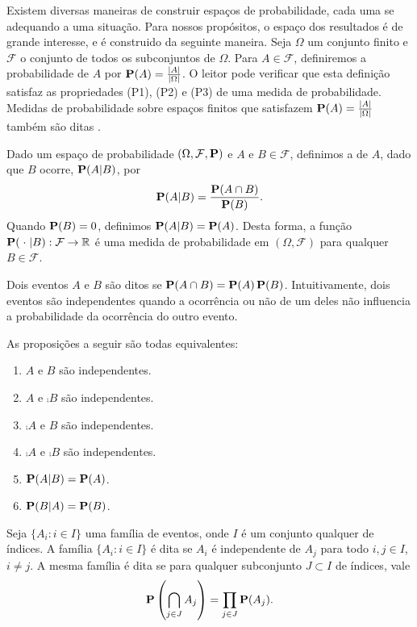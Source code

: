 Existem diversas maneiras de construir espaços de probabilidade, cada uma se adequando a uma situação. Para nossos propósitos, o espaço dos resultados  é de grande interesse, e é construido da seguinte maneira.
Seja $\Omega$ um conjunto finito e $\mathcal{F}$ o conjunto de todos os subconjuntos de $\Omega$. Para $A \in \mathcal{F}$, definiremos a probabilidade de $A$ por $\operatorname{\mathbf{P}}(A) = \frac{\left | A \right |}{\left | \Omega \right |}$. O leitor pode verificar que esta definição satisfaz as propriedades (P1), (P2) e (P3) de uma medida de probabilidade. Medidas de probabilidade sobre espaços finitos que satisfazem $\operatorname{\mathbf{P}}(A) = \frac{\left | A \right |}{\left | \Omega \right |}$ também são ditas .

Dado um espaço de probabilidade $(\Omega, \mathcal{F}, \operatorname{\mathbf{P}})$ e $A$ e $B \in \mathcal{F}$, definimos a  de $A$, dado que $B$ ocorre, $\operatorname{\mathbf{P}}(A | B)$, por
\[ \operatorname{\mathbf{P}}(A|B) = \frac{\operatorname{\mathbf{P}}(A \cap B)}{\operatorname{\mathbf{P}}(B)}. \]
Quando $\operatorname{\mathbf{P}}(B) = 0$, definimos $\operatorname{\mathbf{P}}(A|B) = \operatorname{\mathbf{P}}(A)$. Desta forma, a função $\operatorname{\mathbf{P}}(\; \cdot \;| B) : \mathcal{F} \to \mathbb{R}$ é uma medida de probabilidade em $(\Omega, \mathcal{F})$ para qualquer $B \in \mathcal{F}$.

Dois eventos $A$ e $B$ são ditos  se $\operatorname{\mathbf{P}}(A \cap B) = \operatorname{\mathbf{P}}(A) \operatorname{\mathbf{P}}(B)$. Intuitivamente, dois eventos são independentes quando a ocorrência ou não de um deles não influencia a probabilidade da ocorrência do outro evento.

As proposições a seguir são todas equivalentes:
\begin{enumerate}[label=\arabic*.,itemindent=*]
  \item $A$ e $B$ são independentes.
  \item $A$ e $\comp{B}$ são independentes.
  \item $\comp{A}$ e $B$ são independentes.
  \item $\comp{A}$ e $\comp{B}$ são independentes.
  \item $\operatorname{\mathbf{P}}(A|B) = \operatorname{\mathbf{P}}(A)$.
  \item $\operatorname{\mathbf{P}}(B|A) = \operatorname{\mathbf{P}}(B)$.
\end{enumerate}

Seja $\{ A_i : i \in I\}$ uma família de eventos, onde $I$ é um conjunto qualquer de índices. A família $\{ A_i : i \in I\}$ é dita  se $A_i$ é independente de $A_j$ para todo $i,j \in I$, $i \neq j$. A mesma família é dita  se para qualquer subconjunto $J \subset I$ de índices, vale
\[ \operatorname{\mathbf{P}}\left(\bigcap_{j \in J} A_j \right) = \prod_{j \in J}\operatorname{\mathbf{P}}(A_j).\]

